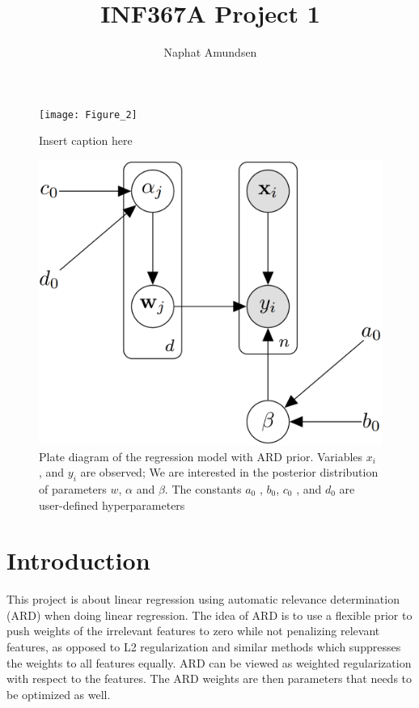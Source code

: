 \documentclass[12pt]{article}
\begin{document}
\title{\textbf{INF367A Project 1}}
\author{Naphat Amundsen}
\maketitle
\sectionfont{\fontsize{14}{15}\selectfont}
\subsectionfont{\fontsize{12}{15}\selectfont}
\subsubsectionfont{\fontsize{12}{15}\selectfont}
\graphicspath{ {./images/} }

\ifx
\begin{figure}[H]
	\centering
	\texttt{[image: Figure\_2]}
	\caption{Insert caption here}
\end{figure}
\fi
\ifx
\begin{figure}[H]
	\centering
	\includegraphics[scale=0.8]{bn_network.png}
	\caption{Plate diagram of the regression model with ARD prior. Variables $x_i$ , and $y_i$ are observed; We are interested in the posterior distribution of parameters $w$, $\alpha$ and $\beta$. The constants $a_0$ , $b_0$, $c_0$ , and $d_0$ are user-defined hyperparameters}
\end{figure}
\fi

\newcommand{\opGamma}{\operatorname{Gamma}}

\section*{Introduction}
    This project is about linear regression using automatic relevance determination (ARD) when doing linear regression. The idea of ARD is to use a flexible prior to push weights of the irrelevant features to zero while not penalizing relevant features, as opposed to L2 regularization and similar methods which suppresses the weights to all features equally. ARD can be viewed as weighted regularization with respect to the features. The ARD weights are then parameters that needs to be optimized as well.
\end{document}
